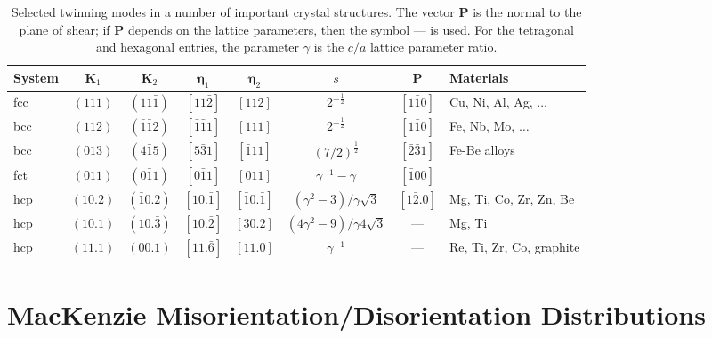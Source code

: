 \begin{table}[t]
\centering\leavevmode
\begin{tabular}{lccccccl}
\hline 
System & $\mathbf{K}_1$  & $\mathbf{K}_2$ & $\bm{\eta}_1$ & $\bm{\eta}_2$ & $s$ & $\mathbf{P}$ & Materials\\
\hline\hline
fcc & $(111)$ & $(11\bar{1})$ & $[11\bar{2}]$ & $[112]$ & $2^{-\frac{1}{2}}$ & $[1\bar{1}0]$ & Cu, Ni, Al, Ag, $\ldots$ \\
bcc & $(112)$ & $(\bar{1}\bar{1}2)$ & $[\bar{1}\bar{1}1]$ & $[111]$ & $2^{-\frac{1}{2}}$ & $[1\bar{1}0]$ &Fe, Nb, Mo, $\ldots$ \\
bcc & $(013)$ & $(4\bar{1}5)$ & $[5\bar{3}1]$ & $[\bar{1}11]$ & $(7/2)^{\frac{1}{2}}$ & $[\bar{2}\bar{3}1]$ & Fe-Be alloys\\
fct & $(011)$ & $(0\bar{1}1)$ & $[0\bar{1}1]$ & $[011]$ & $\gamma^{-1}-\gamma$ & $[\bar{1}00]$ & \\
hcp & $(10.2)$ & $(\bar{1}0.2)$ & $[10.\bar{1}]$ & $[\bar{1}0.\bar{1}]$ & $(\gamma^2-3)/\gamma\sqrt{3}$ & $[1\bar{2}.0]$ &Mg, Ti, Co, Zr, Zn, Be \\
hcp & $(10.1)$ & $(10.\bar{3})$ & $[10.\bar{2}]$ & $[30.2]$ & $(4\gamma^2-9)/\gamma 4\sqrt{3}$ & --- &Mg, Ti \\
hcp & $(11.1)$ & $(00.1)$ & $[11.\bar{6}]$ & $[11.0]$ & $\gamma^{-1}$ & --- &Re, Ti, Zr, Co, graphite \\
\hline
\end{tabular}
\caption{\label{\chabbr:tb:twinning}Selected twinning modes in a number of important crystal structures. The vector $\mathbf{P}$ is the normal to the plane of shear; if $\mathbf{P}$ depends on the lattice parameters, then the symbol --- is used. For the tetragonal and hexagonal entries, the parameter $\gamma$ is the $c/a$ lattice parameter ratio.}
\end{table}





\section{MacKenzie Misorientation/Disorientation Distributions}\label{\chabbr:sec:MacKenzie}

